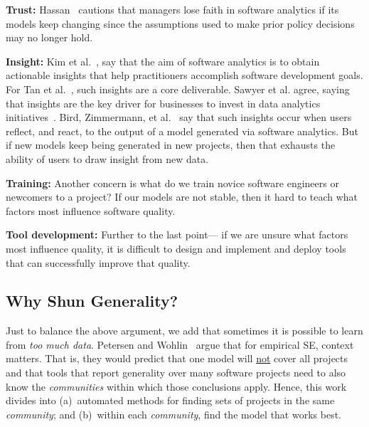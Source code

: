 \documentclass[10pt,journal,compsoc]{IEEEtran}
\begin{document}
\textbf{Trust:} Hassan~\cite{Hassan17} cautions that managers lose faith in software analytics if its models keep changing since  the assumptions used to make prior policy decisions may no longer hold.

\textbf{Insight:} Kim et al.~\cite{Kim2016}, say  that the aim of software analytics is to obtain actionable insights that help practitioners accomplish software development goals. For Tan et al.~\cite{tan2016defining}, such   insights  are a core deliverable. Sawyer et al. agree, saying that  insights are the key driver for businesses to invest in data analytics initiatives~\cite{sawyer2013bi}. Bird, Zimmermann, et al.~\cite{Bird:2015} say that such  insights occur when users reflect, and react, to the output of a model generated via software analytics. But if  new models keep being generated in new projects, then that exhausts the ability of  users to draw insight from  new data.

\textbf{Training:} Another concern is what do we train novice software engineers or newcomers to a project? If our models are not stable, then it hard to teach what factors  most influence software quality.

\textbf{Tool development:} Further to the last point--- if we are unsure what factors most influence quality, it is difficult to design and implement and deploy tools that can successfully improve that quality.





\subsection{Why Shun Generality?}
Just to balance the above argument,
we add that   sometimes it is possible to learn from {\em too much data}.
Petersen and Wohlin~\cite{Petersen2009} argue that for empirical SE, context matters. That is, they would predict that one model  will \underline{not}  cover all  projects and that tools that report  generality  over many software projects need to also know the {\em communities} within which those conclusions   apply. Hence, this work divides into (a)~automated methods for finding sets of projects in the same {\em community}; and (b)~within each {\em community}, find the model that works best. 
\end{document}
